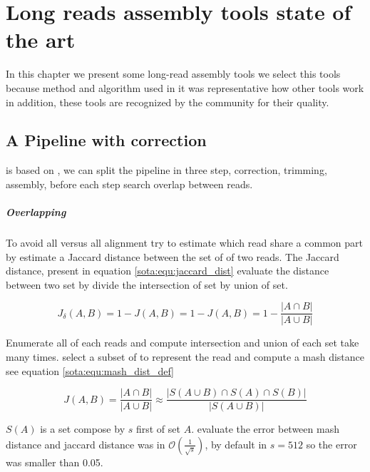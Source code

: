 \documentclass[main]{subfiles}
\begin{document}
\chapter{Long reads assembly tools state of the art}\label{chapter:sota}

In this chapter we present some long-read assembly tools we select this tools because method and algorithm used in it was representative how other tools work in addition, these tools are recognized by the community for their quality.

\section{A Pipeline with correction \canu} \label{section:sota:canu}

\canu is based on  \cite{celera_first, celera_second}, we can split the \canu pipeline in three step, correction, trimming, assembly, before each step \canu search overlap between reads.

\paragraph{Overlapping}

To avoid all versus all alignment \mhap try to estimate which read share a common part by estimate a Jaccard distance between the set of \kmers of two reads. The Jaccard distance, present in equation \ref{sota:equ:jaccard_dist} evaluate the distance between two set by divide the intersection of set by union of set.

\begin{equation}
J_{\delta}(A,B) = 1 - J(A,B) = 1 -  J(A,B) = 1 - \frac{|A \cap B|}{|A \cup B|}
\label{sota:equ:jaccard_dist}
\end{equation}

Enumerate all \kmers of each reads and compute intersection and union of each set take many times. \mhap select a subset of \kmers to represent the read and compute a mash distance \cite{mash_distance} see equation \ref{sota:equ:mash_dist_def} 

\begin{equation}
J(A,B) = \frac{|A \cap B|}{|A \cup B|} \approx \frac{|S(A \cup B) \cap S(A) \cap S(B)|}{|S(A \cup B)|}
\label{sota:equ:mash_dist_def}
\end{equation}

$S(A)$ is a \kmers set compose by $s$ first \kmers of set $A$. \citeauthor{mash_distance} evaluate the error between mash distance and jaccard distance was in $\mathcal{O}(\frac{1}{\sqrt{s}})$, by default in \mhap $s=512$ so the error was smaller than 0.05.
\end{document}
